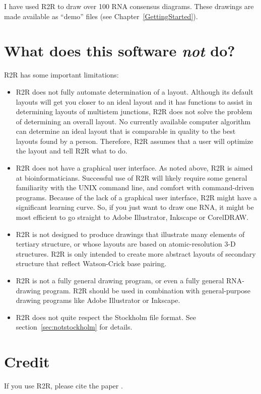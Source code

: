 \documentclass[letterpaper,12pt]{report}
\begin{document}
I have used R2R to draw over 100 RNA consensus diagrams.  These drawings are made available as ``demo'' files (see Chapter~\ref{GettingStarted}).

\section{What does this software {\em not} do?}

R2R has some important limitations:
\begin{itemize}
\item R2R does not fully automate determination of a layout.  Although its default layouts will get you closer to an ideal layout and it has functions to assist in determining layouts of multistem junctions, R2R does not solve the problem of determining an overall layout.  No currently available computer algorithm can determine an ideal layout that is comparable in quality to the best layouts found by a person.  Therefore, R2R assumes that a user will optimize the layout and tell R2R what to do.
\item R2R does not have a graphical user interface.  As noted above, R2R is aimed at bioinformaticians.  Successful use of R2R will likely require some general familiarity with the UNIX command line, and comfort with command-driven programs.
Because of the lack of a graphical user interface, R2R might have a significant learning curve.
So, if you just want to draw one RNA, it might be most efficient to go straight to Adobe Illustrator, Inkscape or CorelDRAW.
\item R2R is not designed to produce drawings that illustrate many elements of tertiary structure, or whose layouts are based on atomic-resolution 3-D structures.
R2R is only intended to create more abstract layouts of secondary structure that reflect Watson-Crick base pairing.
\item R2R is not a fully general drawing program, or even a fully general RNA-drawing program.  R2R should be used in combination with general-purpose drawing programs like Adobe Illustrator or Inkscape.
  \item R2R does not quite respect the Stockholm file format.  See section~\ref{sec:notstockholm} for details.
\end{itemize}

\section{Credit}

If you use R2R, please cite the paper \cite{RtoR}.
\end{document}
